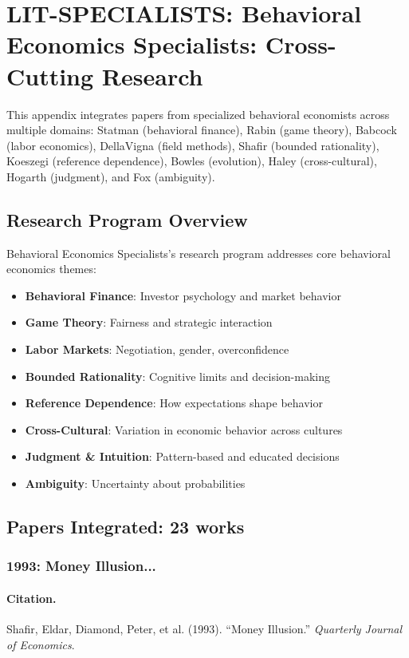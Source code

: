 \section{LIT-SPECIALISTS: Behavioral Economics Specialists: Cross-Cutting Research}
\label{app:litad}

This appendix integrates papers from specialized behavioral economists
across multiple domains: Statman (behavioral finance), Rabin (game theory), Babcock
(labor economics), DellaVigna (field methods), Shafir (bounded rationality), Koeszegi
(reference dependence), Bowles (evolution), Haley (cross-cultural), Hogarth (judgment),
and Fox (ambiguity).

\subsection{Research Program Overview}

Behavioral Economics Specialists's research program addresses core behavioral economics themes:

\begin{itemize}
  \item \textbf{Behavioral Finance}: Investor psychology and market behavior
  \item \textbf{Game Theory}: Fairness and strategic interaction
  \item \textbf{Labor Markets}: Negotiation, gender, overconfidence
  \item \textbf{Bounded Rationality}: Cognitive limits and decision-making
  \item \textbf{Reference Dependence}: How expectations shape behavior
  \item \textbf{Cross-Cultural}: Variation in economic behavior across cultures
  \item \textbf{Judgment & Intuition}: Pattern-based and educated decisions
  \item \textbf{Ambiguity}: Uncertainty about probabilities
\end{itemize}

\subsection{Papers Integrated: 23 works}

\subsubsection{1993: Money Illusion...}

\paragraph{Citation.}
Shafir, Eldar, Diamond, Peter, et al. (1993). ``Money Illusion.''
\textit{Quarterly Journal of Economics}.

